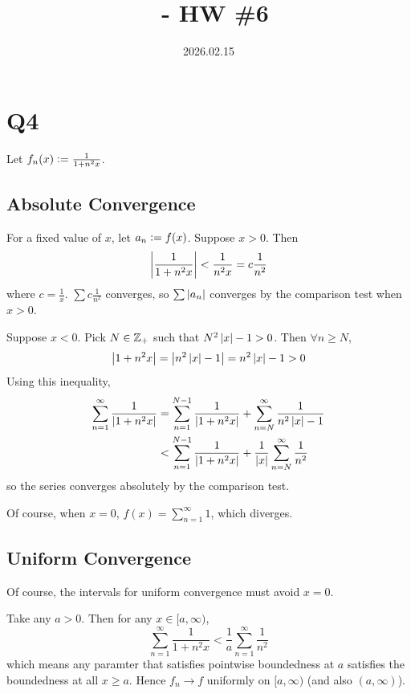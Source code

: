 \documentclass[12pt]{article}
\title{\course\ - HW \#6}
\author{\myname}
\date{2026.02.15}
\begin{document}
\maketitle
\thispagestyle{fancy}


\section*{Q4} 
Let $f_n(x) \vcentcolon= \frac{1}{1 + n^2 x}$. 
\subsection{Absolute Convergence} %
For a fixed value of $x$, let $a_n \vcentcolon= f(x)$.
Suppose $x > 0$. 
Then 
$$\left|\frac{1}{1 + n^2 x}\right| < \frac{1}{n^2 x} = c \frac{1}{n^2}$$ 
where $c = \frac{1}{x}$. 
$\sum c\frac{1}{n^2}$ converges, so $\sum \left|a_n\right|$ converges by the comparison test when $x > 0$.

Suppose $x < 0$.   
Pick $N \in \mathbb{Z}_{+}$ such that $N^2 \left|x\right| - 1 > 0$. 
Then $\forall n \geq N$, 
$$\left|1 + n^2 x\right| = \left|n^2 \left|x\right| - 1\right|  = n^2 \left|x\right| - 1 > 0$$ 
Using this inequality, 
\begin{align*}
  \sum_{n = 1}^{\infty} \frac{1}{\left|1 + n^2 x\right|} & = \sum_{n = 1}^{N - 1} \frac{1}{\left|1 + n^2 x\right|} + \sum_{n = N}^{\infty} \frac{1}{n^2 \left|x\right| - 1} \\ 
                                                  & < \sum_{n = 1}^{N - 1} \frac{1}{\left|1 + n^2 x\right|} + \frac{1}{\left|x\right|} \sum_{n = N}^{\infty} \frac{1}{n^2} 
\end{align*}
so the series converges absolutely by the comparison test. 

Of course, when $x = 0$, $f(x) = \sum_{n = 1}^{\infty} 1$, which diverges. 

\subsection{Uniform Convergence} 
Of course, the intervals for uniform convergence must avoid $x = 0$.  

Take any $a > 0$.
Then for any $x \in [a, \infty)$, 
$$\sum_{n = 1}^{\infty} \frac{1}{1 + n^2 x} < \frac{1}{a} \sum_{n = 1}^{\infty} \frac{1}{n^2}$$
which means any paramter that satisfies pointwise boundedness at $a$ satisfies the boundedness at all $x \geq a$.  
Hence $f_n \rightarrow f$ uniformly on $[a, \infty)$ (and also $(a, \infty)$).  
\end{document}
